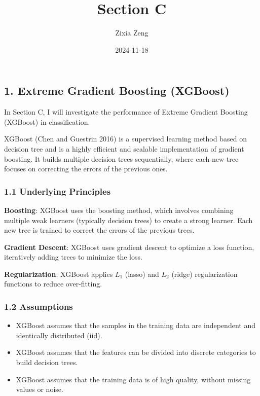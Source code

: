 \documentclass[
]{article}
\title{Section C}
\author{Zixia Zeng}
\date{2024-11-18}
\begin{document}
\maketitle

\subsection{1. Extreme Gradient Boosting
(XGBoost)}\label{extreme-gradient-boosting-xgboost}

In Section C, I will investigate the performance of Extreme Gradient
Boosting (XGBoost) in classification.

XGBoost (Chen and Guestrin 2016) is a supervised learning method based
on decision tree and is a highly efficient and scalable implementation
of gradient boosting. It builds multiple decision trees sequentially,
where each new tree focuses on correcting the errors of the previous
ones.

\subsubsection{1.1 Underlying Principles}\label{underlying-principles}

\textbf{Boosting}: XGBoost uses the boosting method, which involves
combining multiple weak learners (typically decision trees) to create a
strong learner. Each new tree is trained to correct the errors of the
previous trees.

\textbf{Gradient Descent}: XGBoost uses gradient descent to optimize a
loss function, iteratively adding trees to minimize the loss.

\textbf{Regularization}: XGBoost applies \(L_1\) (lasso) and \(L_2\)
(ridge) regularization functions to reduce over-fitting.

\subsubsection{1.2 Assumptions}\label{assumptions}

\begin{itemize}
\item
  XGBoost assumes that the samples in the training data are independent
  and identically distributed (iid).
\item
  XGBoost assumes that the features can be divided into discrete
  categories to build decision trees.
\item
  XGBoost assumes that the training data is of high quality, without
  missing values or noise.
\end{itemize}
\end{document}
